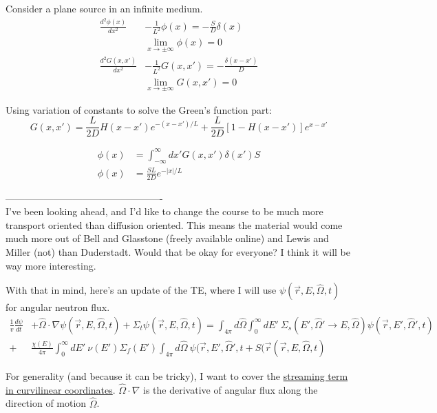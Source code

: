 \documentclass[12pt]{article}
\newcommand{\vOmega}{\ensuremath{\hat{\Omega}}}
\begin{document}
Consider a plane source in an infinite medium.
%
\begin{align*}
\frac{d^2\phi(x)}{dx^2} &- \frac{1}{L^2}\phi(x) = -\frac{S}{D}\delta(x)\\
&\lim\limits_{x\to\pm\infty}\phi(x) = 0\\
\frac{d^2 G(x,x')}{dx^2} &- \frac{1}{L^2}G(x,x') = -\frac{\delta(x-x')}{D}\\
&\lim\limits_{x\to\pm\infty}G(x,x') = 0
\end{align*}

Using variation of constants to solve the Green's function part:
%
\begin{equation*}
G(x,x') = \frac{L}{2D}H(x-x')e^{-(x-x')/L} + \frac{L}{2D}[1-H(x-x')]e^{x-x'}
\end{equation*}

\begin{align*}
\phi(x) &= \int_{-\infty}^{\infty}dx'G(x,x')\delta(x')S\\
\phi(x) &= \frac{SL}{2D}e^{-|x|/L}
\end{align*}

-------------------------------------------------\\
I've been looking ahead, and I'd like to change the course to be much more transport oriented than diffusion oriented. 
This means the material would come much more out of Bell and Glasstone (freely available online) and Lewis and Miller (not) than Duderstadt. 
Would that be okay for everyone?
I think it will be way more interesting. 

With that in mind, here's an update of the TE, where I will use $\psi(\vec{r}, E, \vOmega, t)$ for angular neutron flux.
%
\begin{align*}
\frac{1}{v} \frac{d \psi}{dt} &+ \vOmega \cdot \nabla \psi(\vec{r}, E, \vOmega, t) + \Sigma_t \psi(\vec{r}, E, \vOmega, t) = \int_{4 \pi} d\vOmega \int_0^{\infty} dE' \: \Sigma_s(E', \vOmega' \rightarrow E, \vOmega) \psi(\vec{r}, E', \vOmega', t)\\
 +& \frac{\chi(E)}{4 \pi}\int_0^{\infty} dE' \: \nu(E') \Sigma_f(E') \int_{4 \pi} d\vOmega \:\psi(\vec{r}, E', \vOmega', t + S(\vec{r}(\vec{r}, E, \vOmega, t)
\end{align*}

For generality (and because it can be tricky), I want to cover the \underline{streaming term in curvilinear coordinates}.
$\vOmega \cdot \nabla$ is the derivative of angular flux along the direction of motion $\vOmega$.
\end{document}
